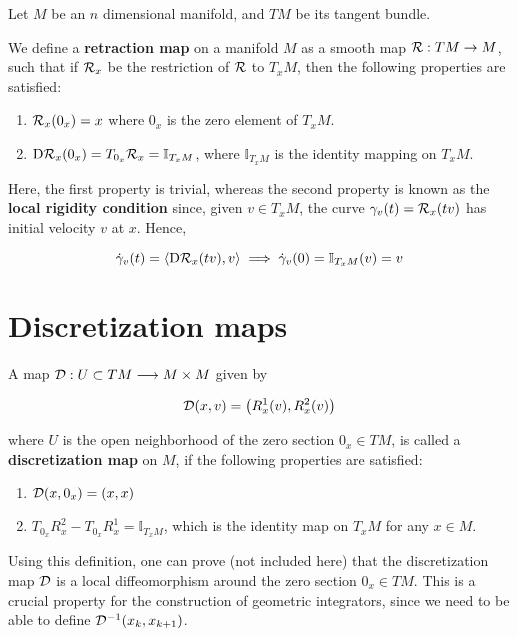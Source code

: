 Let $M$ be an $n$ dimensional manifold, and $TM$ be its tangent bundle.

\begin{defn}\label{defn:retraction}
We define a \textbf{retraction map} on a manifold $M$ as a smooth map $\mathcal{R}: TM \to M$, such that if $\mathcal{R}_x$ be the restriction of $\mathcal{R}$ to $T_x M$, then the following properties are satisfied:

    \begin{enumerate}
        \item $\mathcal{R}_x (0_x) = x$ where $0_x$ is the zero element of $T_x M$.
        \item $\text{D}\mathcal{R}_x (0_x ) = T_{0_x} \mathcal{R}_x = \mathbb{I}_{T_x M} $, where $\mathbb{I}_{T_x M}$ is the identity mapping on $T_x M$.
    \end{enumerate}
\end{defn}

Here, the first property is trivial, whereas the second property is known as the \textbf{local rigidity condition} since, given $v \in T_x M$, the curve $\gamma_v(t) = \mathcal{R}_x(tv)$ has initial velocity $v$ at $x$. Hence,

\[
  \dot{\gamma}_v (t) = \langle \text{D}\mathcal{R}_x (tv) , v \rangle \implies \dot{\gamma}_v (0) = \mathbb{I}_{T_x M}(v) = v
\]

\section{Discretization maps}

\begin{defn}
A map $\mathcal{D} : U \subset TM \longrightarrow M \times M$ given by 

\[
  \mathcal{D} (x,v) = \left( R^1_x(v), R^2_x(v) \right)
\]

where $U$ is the open neighborhood of the zero section $0_x \in TM$, is called a \textbf{discretization map} on $M$, if the following properties are satisfied:

\begin{enumerate}
  \item $\mathcal{D}(x,0_x) = (x,x)$ 
  \item $T_{0_x}R_x^2 - T_{0_x}R_x^1 = \mathbb{I}_{T_x M}$, which is the identity map on $T_x M$ for any $x \in M$.
\end{enumerate}
\end{defn}

Using this definition, one can prove (not included here) that the discretization map $\mathcal{D}$ is a local diffeomorphism around the zero section $0_x \in TM$. This is a crucial property for the construction of geometric integrators, since we need to be able to define $\mathcal{D}^{-1} (x_k, x_{k+1})$.

